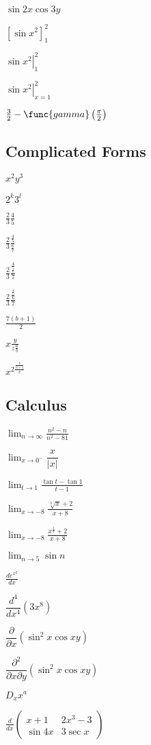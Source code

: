 \documentclass{article}
\begin{document}
$\sin 2x\cos 3y$

$\left[ \sin x^{2}\right] _{1}^{2}$

$\left. \sin x^{2}\right\vert _{1}^{2}$

$\left. \sin x^{2}\right\vert _{x=1}^{2}$

$\frac{3}{2}-\func{gamma}\left( \frac{\pi }{2}\right) $

\subsection{Complicated Forms}

$x^{2}y^{3}$

$2^{k}3^{l}$

$\frac{2}{3}\frac{4}{5}$

$\frac{2}{3}\frac{\frac{4}{5}}{\frac{6}{7}}$

$\frac{2}{3}\frac{\frac{4}{\frac{5}{6}}}{7}$

$\frac{2}{3}\frac{\frac{\frac{4}{5}}{6}}{7}$

$\frac{7\left( b+1\right) }{2}$

$x\frac{y}{z\frac{a}{b}}$

$x^{2\frac{\frac{b}{n+1}}{c}}$

\subsection{Calculus}

$\lim_{n\rightarrow \infty }\frac{n^{2}-n}{n^{2}-81}$

$\lim_{x\rightarrow 0^{-}}\dfrac{x}{\left\vert x\right\vert }$

$\lim_{t\rightarrow 1}\frac{\tan t-\tan 1}{t-1}$

$\lim_{x\rightarrow -8}\frac{\sqrt[3]{x}+2}{x+8}$

$\lim_{x\rightarrow -8}\frac{x^{\frac{1}{3}}+2}{x+8}$

$\lim_{n\rightarrow 5}\sin n$

$\frac{de^{x^{2}}}{dx}$

$\dfrac{d^{4}}{dx^{4}}\left( 3x^{8}\right) $

$\dfrac{\partial }{\partial x}\left( \sin ^{2}x\cos xy\right) $

$\dfrac{\partial ^{2}}{\partial x\partial y}\left( \sin ^{2}x\cos xy\right) $

$D_{x}x^{a}$

$\frac{d}{dx}\left( 
\begin{array}{cc}
x+1 & 2x^{3}-3 \\ 
\sin 4x & 3\sec x%
\end{array}%
\right) $
\end{document}
